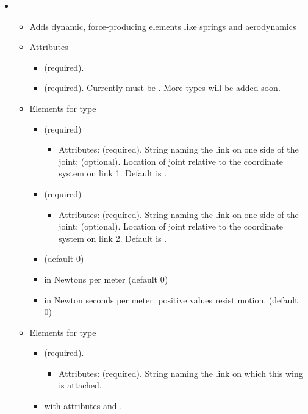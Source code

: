 \begin{itemize}
\item {}
\begin{itemize}
\item Adds dynamic, force-producing elements like springs and
  aerodynamics
\item Attributes
\begin{itemize}
\item {} (required).
\item {} (required).  Currently must be
  .  More types will be added soon.
\end{itemize}
\item Elements for type 
\begin{itemize}
\item {} (required)  
\begin{itemize}
\item Attributes:  (required). String naming the link on
  one side of the joint;  (optional). Location of joint relative to the coordinate system on link 1. Default is .
\end{itemize}
\item {} (required)
\begin{itemize}
\item Attributes:  (required). String naming the link on
  one side of the joint;  (optional). Location of joint relative to the coordinate system on link 2. Default is .
\end{itemize}
\item {} (default 0)
\item {} in Newtons per meter (default 0)
\item {} in Newton seconds per meter.  positive values
  resist motion.  (default 0)
\end{itemize}
\item Elements for type 
\begin{itemize}
\item {} (required). 
\begin{itemize} 
\item Attributes:  (required).  String naming
  the link on which this wing is attached.
\end{itemize}
\item {} with attributes  and .

\end{itemize}
\end{itemize}
\end{itemize}
